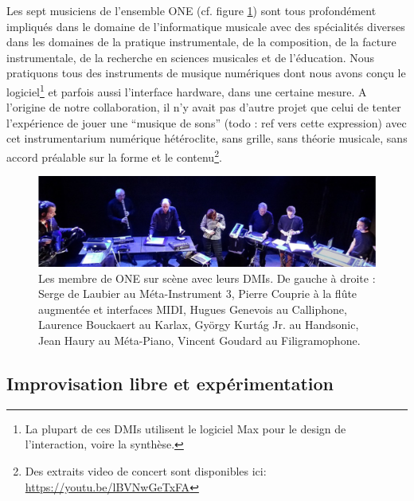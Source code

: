 \noindent Les sept musiciens de l'ensemble ONE (cf. figure \ref{fig:notation:one-fullband}) sont tous profondément impliqués dans le domaine de l'informatique musicale avec des spécialités diverses dans les domaines de la pratique instrumentale, de la composition, de la facture instrumentale, de la recherche en sciences musicales et de l'éducation. Nous pratiquons tous des instruments de musique numériques dont nous avons conçu le logiciel\footnote{La plupart de ces \glspl{DMI} utilisent le logiciel Max pour le design de l'interaction, voire la synthèse.} et parfois aussi l'interface hardware, dans une certaine mesure.
A l'origine de notre collaboration, il n'y avait pas d'autre projet que celui de tenter l'expérience de jouer une ``musique de sons'' (todo : ref vers cette expression) avec cet instrumentarium numérique hétéroclite, sans grille, sans théorie musicale, sans accord préalable sur la forme et le contenu\footnote{Des extraits video de concert sont disponibles ici: \url{https://youtu.be/lBVNwGeTxFA}}.\\

\begin{figure}[!htbp]
	\captionsetup{format=plain}%
	\includegraphics[width=\textwidth]{gfx/notation/ONE-fullBand.png}
	\caption[Les membres de ONE et leurs DMIs]{Les membre de ONE sur scène avec leurs \glspl{DMI}. De gauche à droite : Serge de Laubier au Méta-Instrument 3, Pierre Couprie à la flûte augmentée et interfaces MIDI, Hugues Genevois au Calliphone, Laurence Bouckaert au Karlax, György Kurtág Jr. au Handsonic, Jean Haury au Méta-Piano, Vincent Goudard au Filigramophone.}
	\label{fig:notation:one-fullband}
\end{figure}

\subsection{Improvisation libre et expérimentation}

